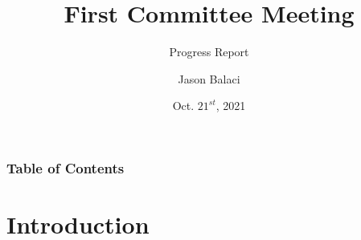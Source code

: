 \documentclass{beamer}
\title[Committee Meeting 1]{First Committee Meeting}
\subtitle{Progress Report}
\author{Jason Balaci}
\institute{McMaster University}
\date{Oct. $21^{st}$, 2021}
\begin{document}
\frame{\titlepage}


\begin{frame}
\frametitle{Table of Contents}
\tableofcontents
\end{frame}

\section{Introduction}

\end{document}
